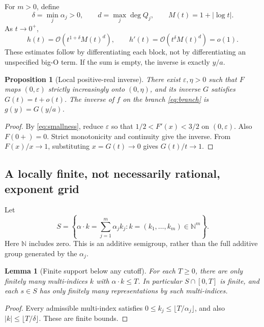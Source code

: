 \documentclass[11pt,a4paper]{article}
\newcommand{\N}{\mathbb N}
\newcommand{\OO}{\mathcal O}
\newtheorem{lemma}[theorem]{Lemma}
\newtheorem{proposition}[theorem]{Proposition}
\theoremstyle{definition}
\begin{document}
For \(m>0\), define
\begin{equation}\label{eq:parameters}
 \delta=\min_j\alpha_j>0,
 \qquad d=\max_j\deg Q_j,
 \qquad M(t)=1+|\log t|.
\end{equation}
As \(t\to0^+\),
\begin{equation}\label{eq:smallness}
 h(t)=\OO(t^{1+\delta}M(t)^d),\qquad
 h'(t)=\OO(t^\delta M(t)^d)=o(1).
\end{equation}
These estimates follow by differentiating each block, not by differentiating
an unspecified big-O term. If the sum is empty, the inverse is exactly \(y/a\).

\begin{proposition}[Local positive-real inverse]\label{prop:branch}
There exist \(\varepsilon,\eta>0\) such that \(F\) maps
\((0,\varepsilon)\) strictly increasingly onto \((0,\eta)\), and its inverse
\(G\) satisfies \(G(t)=t+o(t)\). The inverse of \(f\) on the branch
\eqref{eq:branch} is \(g(y)=G(y/a)\).
\end{proposition}
\begin{proof}
By \eqref{eq:smallness}, reduce \(\varepsilon\) so that
\(1/2<F'(x)<3/2\) on \((0,\varepsilon)\). Also \(F(0+)=0\).
Strict monotonicity and continuity give the inverse. From
\(F(x)/x\to1\), substituting \(x=G(t)\to0\) gives \(G(t)/t\to1\).
\end{proof}

\subsection{A locally finite, not necessarily rational, exponent grid}
Let
\begin{equation}\label{eq:semigroup}
 S=\left\{\alpha\cdot k=\sum_{j=1}^m\alpha_jk_j:
           k=(k_1,\ldots,k_m)\in\N^m\right\}.
\end{equation}
Here \(\N\) includes zero. This is an additive semigroup, rather than the full
additive group generated by the \(\alpha_j\).

\begin{lemma}[Finite support below any cutoff]\label{lem:finite}
For each \(T\ge0\), there are only finitely many multi-indices \(k\) with
\(\alpha\cdot k\le T\). In particular \(S\cap[0,T]\) is finite, and each
\(s\in S\) has only finitely many representations by such multi-indices.
\end{lemma}
\begin{proof}
Every admissible multi-index satisfies
\(0\le k_j\le\lfloor T/\alpha_j\rfloor\), and also
\(|k|\le\lfloor T/\delta\rfloor\). These are finite bounds.
\end{proof}
\end{document}
